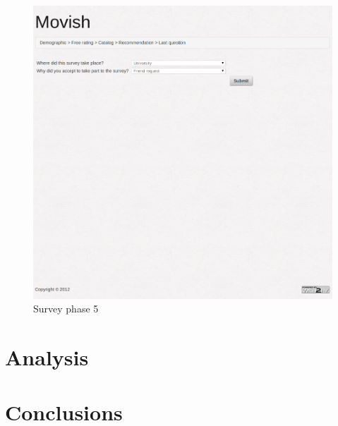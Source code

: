 \begin{figure}
  \centering
  \includegraphics[width=\textwidth]{figures/survey_localinfo.png}
  \caption{Survey phase 5}
  \label{fig:survey_phase_5}
\end{figure}


\section{Analysis}
\label{sec:research_analysis}

\section{Conclusions}
\label{sec:research_conclusions}


\acresetall